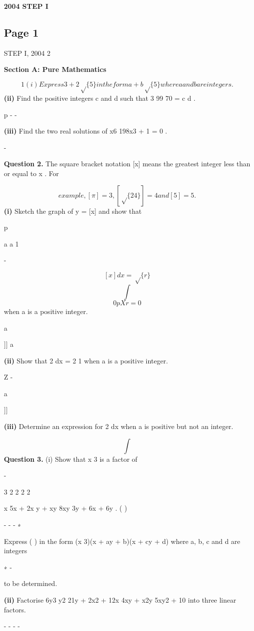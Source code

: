 \documentclass[12pt]{article}
\begin{document}
\begin{center}
{\Large \textbf{2004 STEP I}}
\end{center}

\subsection*{Page 1}
\begin{flushleft}
STEP I, 2004 2\par
\bigskip\textbf{Section A: Pure Mathematics}\par
\[1 (i) Express 3 + 2\sqrt\{5\} in the form a + b\sqrt\{5\} where a and b are integers.\]
\textbf{(ii)} Find the positive integers c and d such that 3 99 70 = c d .\par
p - -\par
\textbf{(iii)} Find the two real solutions of x6 198x3 + 1 = 0 .\par
-\par
\bigskip\textbf{Question 2.} The square bracket notation [x] means the greatest integer less than or equal to x . For\par
\[example, [\pi] = 3 , [\sqrt\{24\} ] = 4 and [5] = 5 .\]
\textbf{(i)} Sketch the graph of y = [x] and show that\par
p\par
a a 1\par
-\par
\[[x] dx = \sqrt\{r\}\]
\[\int\]
\[0 p Xr=0\]
when a is a positive integer.\par
a\par
[[[x]]] a\par
\textbf{(ii)} Show that 2 dx = 2 1 when a is a positive integer.\par
Z -\par
a\par
[[[x]]]\par
\textbf{(iii)} Determine an expression for 2 dx when a is positive but not an integer.\par
\[\int\]
\bigskip\textbf{Question 3.} (i) Show that x 3 is a factor of\par
-\par
3 2 2 2 2\par
x 5x + 2x y + xy 8xy 3y + 6x + 6y . ( )\par
- - - ∗\par
Express ( ) in the form (x 3)(x + ay + b)(x + cy + d) where a, b, c and d are integers\par
∗ -\par
to be determined.\par
\textbf{(ii)} Factorise 6y3 y2 21y + 2x2 + 12x 4xy + x2y 5xy2 + 10 into three linear factors.\par
- - - -\par
\end{flushleft}
\end{document}
